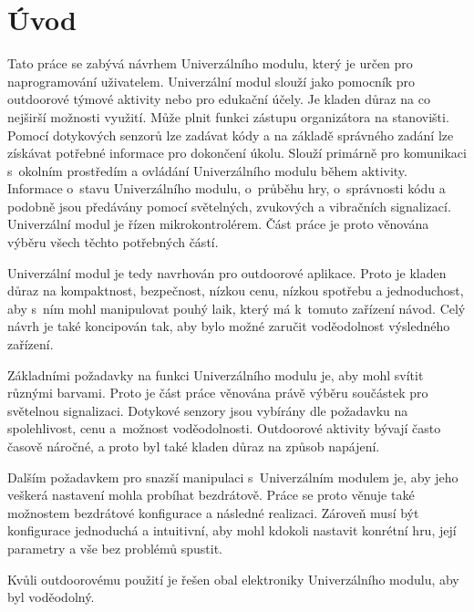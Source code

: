 \chapter*{Úvod}
{}
Tato práce se zabývá návrhem Univerzálního modulu, který je určen pro naprogramování uživatelem. Univerzální modul slouží jako pomocník pro outdoorové 
týmové aktivity nebo pro edukační účely. Je kladen důraz na co 
nejširší možnosti využití. Může plnit funkci zástupu organizátora na stanovišti. Pomocí dotykových senzorů lze zadávat kódy a na základě správného 
zadání lze získávat potřebné informace pro dokončení úkolu. Slouží primárně pro komunikaci s~okolním prostředím a ovládání Univerzálního modulu během
aktivity. Informace o~stavu Univerzálního modulu, o~průběhu hry, o~správnosti kódu a podobně
jsou předávány pomocí světelných, zvukových a vibračních signalizací. 
Univerzální modul je řízen mikrokontrolérem. Část práce je proto věnována výběru všech těchto potřebných částí.

Univerzální modul je tedy navrhován pro outdoorové aplikace. Proto je kladen důraz na kompaktnost, bezpečnost, nízkou cenu, nízkou spotřebu a jednoduchost, 
aby s~ním mohl manipulovat pouhý laik, který má k~tomuto zařízení návod. Celý návrh je také koncipován tak, aby bylo možné zaručit voděodolnost 
výsledného zařízení. 

Základními požadavky na funkci Univerzálního modulu je, aby mohl svítit různými barvami. Proto je část práce věnována právě výběru součástek pro světelnou 
signalizaci. Dotykové senzory jsou vybírány dle požadavku na spolehlivost, cenu a~možnost voděodolnosti. Outdoorové aktivity bývají často časově náročné, 
a proto byl také kladen důraz na způsob napájení. 

Dalším požadavkem pro snazší manipulaci s~Univerzálním modulem je, aby jeho veškerá nastavení mohla probíhat bezdrátově. Práce se proto věnuje také možnostem 
bezdrátové konfigurace a následné realizaci. Zároveň musí být konfigurace jednoduchá a intuitivní, aby mohl kdokoli nastavit konrétní hru, její parametry a 
vše bez problémů spustit.  

Kvůli outdoorovému použití je řešen obal elektroniky Univerzálního modulu, aby byl voděodolný. 





